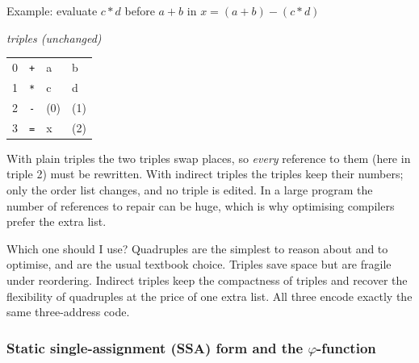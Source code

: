 \documentclass[11pt,a4paper]{article}
\begin{document}
\begin{examplebox}{Example: evaluate $c*d$ before $a+b$ in $x = (a+b)-(c*d)$}
\begin{center}
\begin{minipage}[t]{0.33\textwidth}
\smallskip
\emph{triples (unchanged)}\\[2pt]
\begin{tabular}{@{}c l l l@{}}
0 & \texttt{+} & a & b \\
1 & \texttt{*} & c & d \\
2 & \texttt{-} & (0) & (1) \\
3 & \texttt{=} & x & (2) \\
\end{tabular}
\end{minipage}
\end{center}

With plain triples the two triples swap places, so \emph{every} reference to them (here in triple 2) must be rewritten. With indirect triples the triples keep their numbers; only the order list changes, and no triple is edited. In a large program the number of references to repair can be huge, which is why optimising compilers prefer the extra list.
\end{examplebox}

\begin{notebox}{Which one should I use?}
Quadruples are the simplest to reason about and to optimise, and are the usual textbook choice. Triples save space but are fragile under reordering. Indirect triples keep the compactness of triples and recover the flexibility of quadruples at the price of one extra list. All three encode exactly the same three-address code.
\end{notebox}

\subsubsection{Static single-assignment (SSA) form and the \texorpdfstring{$\varphi$}{phi}-function}
\label{sec:ssa}
\end{document}
